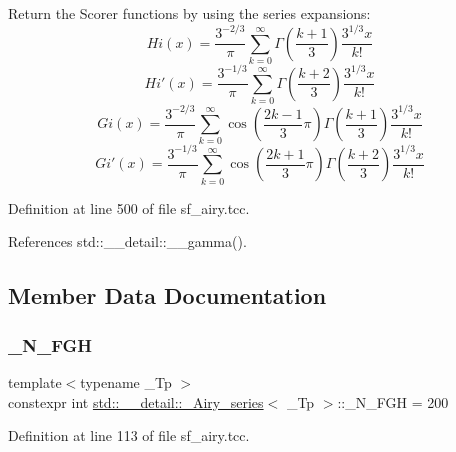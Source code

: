 Return the Scorer functions by using the series expansions\+: \[ Hi(x) = \frac{3^{-2/3}}{\pi} \sum_{k=0}^\infty \Gamma\left(\frac{k+1}{3}\right) \frac{3^{1/3}x}{k!} \] \[ Hi'(x) = \frac{3^{-1/3}}{\pi} \sum_{k=0}^\infty \Gamma\left(\frac{k+2}{3}\right) \frac{3^{1/3}x}{k!} \] \[ Gi(x) = \frac{3^{-2/3}}{\pi} \sum_{k=0}^\infty \cos\left(\frac{2k-1}{3}\pi\right) \Gamma\left(\frac{k+1}{3}\right) \frac{3^{1/3}x}{k!} \] \[ Gi'(x) = \frac{3^{-1/3}}{\pi} \sum_{k=0}^\infty \cos\left(\frac{2k+1}{3}\pi\right) \Gamma\left(\frac{k+2}{3}\right) \frac{3^{1/3}x}{k!} \] 

Definition at line 500 of file sf\+\_\+airy.\+tcc.



References std\+::\+\_\+\+\_\+detail\+::\+\_\+\+\_\+gamma().



\subsection{Member Data Documentation}
\mbox{\label{classstd_1_1____detail_1_1__Airy__series_a01e903f238d8c10c82cea4c115612ad8}} 
\subsubsection{\texorpdfstring{\+\_\+\+N\+\_\+\+F\+GH}{\_N\_FGH}}
{\footnotesize\ttfamily template$<$typename \+\_\+\+Tp $>$ \\
constexpr int \hyperlink{classstd_1_1____detail_1_1__Airy__series}{std\+::\+\_\+\+\_\+detail\+::\+\_\+\+Airy\+\_\+series}$<$ \+\_\+\+Tp $>$\+::\+\_\+\+N\+\_\+\+F\+GH = 200\hspace{0.3cm}{\ttfamily [static]}}



Definition at line 113 of file sf\+\_\+airy.\+tcc.

\mbox{\label{classstd_1_1____detail_1_1__Airy__series_a530108939a1c52d530e1d2ff577195b2}} 
